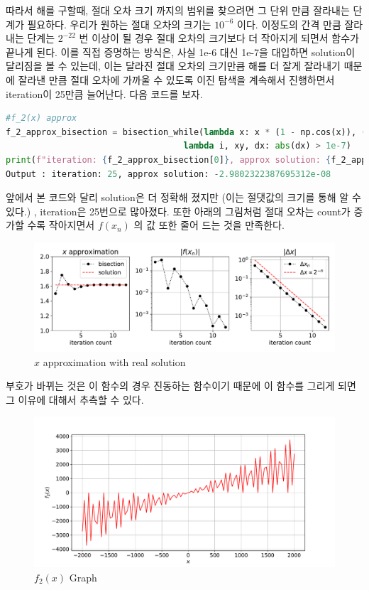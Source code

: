 \documentclass[11pt]{article}
\begin{document}
따라서 해를 구할때, 절대 오차 크기 까지의 범위를 찾으려면 그 단위 만큼 잘라내는 단계가 필요하다. 우리가 원하는 절대 오차의 크기는 $10^{-6}$ 이다. 이정도의 간격 만큼 잘라내는 단계는 $2^{-22}$ 번 이상이 될 경우 절대 오차의 크기보다 더 작아지게 되면서 함수가 끝나게 된다. 이를 직접 증명하는 방식은, 사실 1e-6 대신 1e-7을 대입하면 solution이 달리짐을 볼 수 있는데, 이는 달라진 절대 오차의 크기만큼 해를 더 잘게 잘라내기 때문에 잘라낸 만큼 절대 오차에 가까울 수 있도록 이진 탐색을 계속해서 진행하면서 iteration이 25만큼 늘어난다. 다음 코드를 보자. 
\begin{lstlisting}[language=Python]
#f_2(x) approx
f_2_approx_bisection = bisection_while(lambda x: x * (1 - np.cos(x)), (-2,1),
                                   lambda i, xy, dx: abs(dx) > 1e-7)
print(f"iteration: {f_2_approx_bisection[0]}, approx solution: {f_2_approx_bisection[1]}")
Output : iteration: 25, approx solution: -2.9802322387695312e-08
\end{lstlisting}
\noindent  
앞에서 본 코드와 달리 solution은 더 정확해 졌지만 (이는 절댓값의 크기를 통해 알 수 있다.) , iteration은 25번으로 많아졌다. 또한 아래의 그림처럼 절대 오차는 count가 증가할 수록 작아지면서 $f(x_n)$ 의 값 또한 줄어 드는 것을 만족한다. 
\begin{figure}[!ht]
  \centering
  \includegraphics[width=1\textwidth]{bisection_sol_Method_approximation.pdf}
  \caption{$x$ approximation with real solution}
\end{figure}

\noindent  
부호가 바뀌는 것은 이 함수의 경우 진동하는 함수이기 때문에 이 함수를 그리게 되면 그 이유에 대해서 추측할 수 있다. 

\begin{figure}[!ht]
  \centering
  \includegraphics[width=1\textwidth]{f_2(x).pdf}
  \caption{$f_2(x)$ Graph}
\end{figure}
\end{document}
